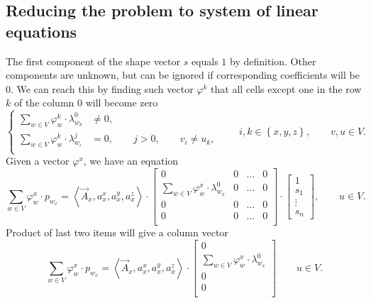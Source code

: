 \subsection{Reducing the problem to system of linear equations}
The first component of the shape vector $s$ equals $1$ by definition.
Other components are unknown,
but can be ignored if corresponding coefficients will be $0$.
We can reach this by finding such vector $\varphi^k$
that all cells except one in the row $k$ of the column $0$ will become zero
\begin{equation*}
  \begin{cases}
    \sum\limits_{w \in V} \varphi_w^k \cdot \lambda_{w_k}^0 &\neq 0, \\
    \sum\limits_{w \in V} \varphi_w^k \cdot \lambda_{w_i}^j &= 0,
      \qquad j > 0,
      \qquad v_i \neq u_k, \\
  \end{cases}
  \qquad i, k \in \left\{ x, y, z \right\},
  \qquad v, u \in V.
\end{equation*}
Given a vector $\varphi^x$, we have an equation
\begin{equation*}
  \sum\limits_{w \in V} \varphi_w^x \cdot p_{w_x}
  = \left\langle \vec{A}_x, a_x^x, a_x^y, a_x^z \right\rangle
    \cdot \begin{bmatrix}
      0                                     & 0 & \dots & 0 \\
      \sum\limits_{w \in V} \varphi_w^x
        \cdot \lambda^0_{w_x} & 0 & \dots   & 0 \\
      0                                     & 0 & \dots & 0 \\
      0                                     & 0 & \dots & 0 \\
    \end{bmatrix}
    \cdot \begin{bmatrix}
      1 \\
      s_1 \\
      \vdots \\
      s_n
    \end{bmatrix},
  \qquad u \in V.
\end{equation*}
Product of last two items will give a column vector
\begin{equation*}
  \sum\limits_{w \in V} \varphi_w^x \cdot p_{w_x}
  = \left\langle \vec{A}_x, a_x^x, a_x^y, a_x^z \right\rangle
    \cdot \begin{bmatrix}
      0 \\
      \sum\limits_{w \in V} \varphi_w^x
        \cdot \lambda^0_{w_x}               \\
      0                                     \\
      0                                     \\
    \end{bmatrix}
  \qquad u \in V.
\end{equation*}
